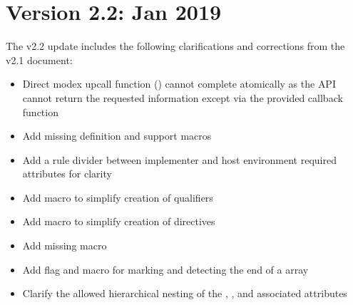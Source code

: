 \section{Version 2.2: Jan 2019}

The v2.2 update includes the following clarifications and corrections from the v2.1 document:

\begin{itemize}
    \item Direct modex upcall function () cannot complete atomically as the \ac{API} cannot return the requested information except via the provided callback function
    \item Add missing  definition and support macros
    \item Add a rule divider between implementer and host environment required attributes for clarity
    \item Add  macro to simplify creation of  qualifiers
    \item Add  macro to simplify creation of  directives
    \item Add missing  macro
    \item Add flag and  macro for marking and detecting the end of a  array
    \item Clarify the allowed hierarchical nesting of the , , and associated attributes
\end{itemize}
